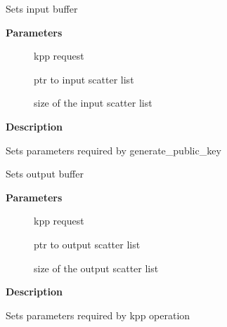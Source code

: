 \documentclass[a4paper,8pt,english]{sphinxmanual}
\begin{document}
\begin{fulllineitems}
\label{crypto/api-kpp:c.kpp_request_set_input}
Sets input buffer

\end{fulllineitems}


\textbf{Parameters}
\begin{description}
\item[{}] \leavevmode
kpp request

\item[{}] \leavevmode
ptr to input scatter list

\item[{}] \leavevmode
size of the input scatter list

\end{description}

\textbf{Description}

Sets parameters required by generate\_public\_key

\begin{fulllineitems}
\label{crypto/api-kpp:c.kpp_request_set_output}
Sets output buffer

\end{fulllineitems}


\textbf{Parameters}
\begin{description}
\item[{}] \leavevmode
kpp request

\item[{}] \leavevmode
ptr to output scatter list

\item[{}] \leavevmode
size of the output scatter list

\end{description}

\textbf{Description}

Sets parameters required by kpp operation
\end{document}
